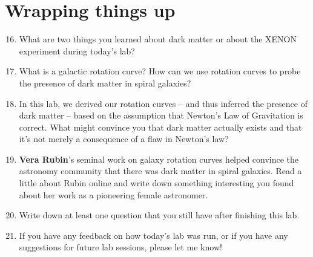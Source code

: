 \documentclass[11pt]{article}%
\begin{document}
\section{Wrapping things up}
\begin{enumerate}
\setcounter{enumi}{15}

\item What are two things you learned about dark matter or about the XENON experiment during today's lab?

\item What is a galactic rotation curve? How can we use rotation curves to probe the presence of dark matter in spiral galaxies? 

\item In this lab, we derived our rotation curves -- and thus inferred the presence of dark matter -- based on the assumption that Newton's Law of Gravitation is correct. What might convince you that dark matter actually exists and that it's not merely a consequence of a flaw in Newton's law? 

\item \textbf{Vera Rubin}'s seminal work on galaxy rotation curves helped convince the astronomy community that there was dark matter in spiral galaxies. Read a little about Rubin online and write down something interesting you found about her work as a pioneering female astronomer.

\item Write down at least one question that you still have after finishing this lab.

\item If you have any feedback on how today's lab was run, or if you have any suggestions for future lab sessions, please let me know!

\end{enumerate}
\end{document}
